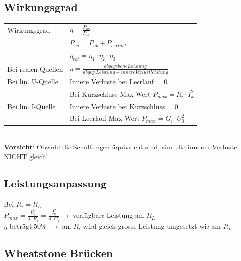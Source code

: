 \subsection{Wirkungsgrad}
\begin{tabular}{ll}
Wirkungsgrad & $\eta = \frac{P_{ab}}{P_{zu}}$ \\[3pt]
& $ P_{zu} = P_{ab}+P_{verlust} $\\
& $ \eta_{tot} = \eta_1 \cdot \eta_2 \cdot \eta_3 $\\
Bei realen Quellen & $\eta = \frac{abgegebene Leistung}{abgeg. Leistung + innere Verlustleistung}$\\
Bei lin. U-Quelle & Innere Verluste bei Leerlauf = 0\\
& Bei Kurzschluss Max-Wert $P_{max} = R_i \cdot I_k^2$\\
Bei lin. I-Quelle & Innere Verluste bei Kurzschluss = 0\\
& Bei Leerlauf Max-Wert $P_{max} = G_i \cdot U_0^2$\\
\end{tabular}\\
\textbf{Vorsicht:} Obwohl die Schaltungen äquivalent sind, sind die inneren Verluste NICHT gleich!

\subsection{Leistungsanpassung}
Bei $R_i = R_L$ \\[3pt]
$P_{max} = \frac{U_q^2}{4 \cdot R_i} = \frac{I_q^2}{4 \cdot G_i}\rightarrow$ verfügbare Leistung am $R_L$\\[3pt]
$\eta$ beträgt 50\% $\rightarrow$ am $R_i$ wird gleich grosse Leistung umgesetzt wie am $R_L$\\

\subsection{Wheatstone Brücken}
